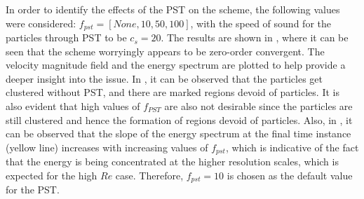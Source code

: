 In order to identify the effects of the PST on the scheme, the following values were considered: $f_{pst} = [None, 10, 50, 100]$, with the speed of sound for the particles through PST to be $c_s = 20$. The results are shown in , where it can be seen that the scheme worryingly appears to be zero-order convergent. The velocity magnitude field and the energy spectrum are plotted to help provide a deeper insight into the issue.
In , it can be observed that the particles get clustered without PST, and there are marked regions devoid of particles. It is also evident that high values of $f_{PST}$ are also not desirable since the particles are still clustered and hence the formation of regions devoid of particles.
Also, in , it can be observed that the slope of the energy spectrum at the final time instance (yellow line) increases with increasing values of $f_{pst}$, which is indicative of the fact that the energy is being concentrated at the higher resolution scales, which is expected for the high $Re$ case.
Therefore, $f_{pst} = 10$ is chosen as the default value for the PST.

